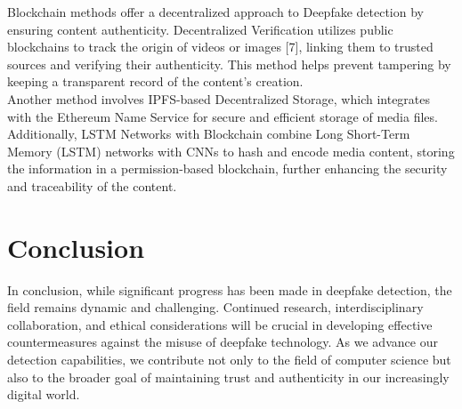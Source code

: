 \documentclass[conference]{IEEEtran}
\begin{document}
            Blockchain methods offer a decentralized approach to Deepfake detection by ensuring content authenticity. Decentralized Verification utilizes public blockchains to track the origin of videos or images [7], linking them to trusted sources and verifying their authenticity. This method helps prevent tampering by keeping a transparent record of the content's creation.\\
            
            Another method involves IPFS-based Decentralized Storage, which integrates with the Ethereum Name Service for secure and efficient storage of media files. Additionally, LSTM Networks with Blockchain combine Long Short-Term Memory (LSTM) networks with CNNs to hash and encode media content, storing the information in a permission-based blockchain, further enhancing the security and traceability of the content.
            
    \begin{center}
    \end{center}
    

    \section{Conclusion}
    
    In conclusion, while significant progress has been made in deepfake detection, the field remains dynamic and challenging. Continued research, interdisciplinary collaboration, and ethical considerations will be crucial in developing effective countermeasures against the misuse of deepfake technology. As we advance our detection capabilities, we contribute not only to the field of computer science but also to the broader goal of maintaining trust and authenticity in our increasingly digital world.
\end{document}
